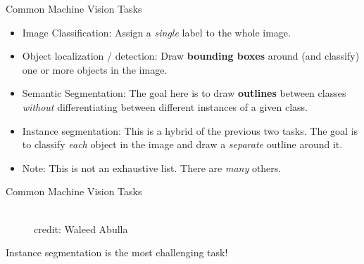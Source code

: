 








\begin{frame} {Common Machine Vision Tasks}
  \begin{itemize}
    \item Image Classification: Assign a \textit{single} label to the whole image.
    \item Object localization / detection: Draw \textbf{bounding boxes} around (and classify) one or more objects in the image.
    \item Semantic Segmentation: The goal here is to draw \textbf{outlines} between classes \textit{without} differentiating between different instances of a given class.
    \item Instance segmentation: This is a hybrid of the previous two tasks. The goal is to classify \textit{each} object in the image and draw a \textit{separate} outline around it.
    \item Note: This is not an exhaustive list. There are \textit{many} others.
    \end{itemize}
\end{frame}


\begin{frame} {Common Machine Vision Tasks}
  \begin{figure}
    \centering
      \tiny{\\credit: Waleed Abulla}
  \end{figure}
    Instance segmentation is the most challenging task!
\end{frame}

